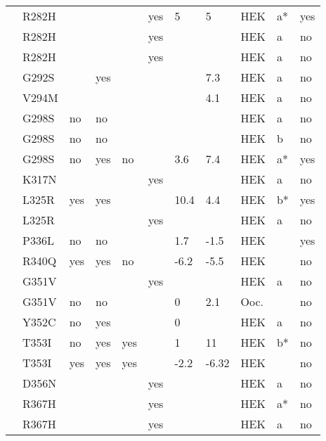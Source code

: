 \begin{tiny}
\begin{longtable}{p{4cm}|l|llll|ll|lll}
\citet{Itoh2005aMutationDB} & R282H &  &  &  & yes & 5 & 5 & HEK & a* & yes \\
\citet{Poelzing2006MutationDB} & R282H &  &  &  & yes &  &  & HEK & a & no \\
\citet{Shinlapawittayatorn2011aMutationDB} & R282H &  &  &  & yes &  &  & HEK & a & no \\
\citet{Shinlapawittayatorn2011aMutationDB} & G292S &  & yes &  &  &  & 7.3 & HEK & a & no \\
\citet{Shinlapawittayatorn2011aMutationDB} & V294M &  &  &  &  &  & 4.1 & HEK & a & no \\
\citet{Saito2009MutationDB} & G298S & no & no &  &  &  &  & HEK & a & no \\
\citet{Saito2009MutationDB} & G298S & no & no &  &  &  &  & HEK & b & no \\
\citet{Wang2002MutationDB} & G298S & no & yes & no &  & 3.6 & 7.4 & HEK & a* & yes \\
\citet{Shinlapawittayatorn2011aMutationDB} & K317N &  &  &  & yes &  &  & HEK & a & no \\
\citet{Keller2005MutationDB} & L325R & yes & yes &  &  & 10.4 & 4.4 & HEK & b* & yes \\
\citet{Shinlapawittayatorn2011aMutationDB} & L325R &  &  &  & yes &  &  & HEK & a & no \\
\citet{Cordeiro2006MutationDB} & P336L & no & no &  &  & 1.7 & -1.5 & HEK &  & yes \\
\citet{Olesen2012MutationDB} & R340Q & yes & yes & no &  & -6.2 & -5.5 & HEK &  & no \\
\citet{Shinlapawittayatorn2011aMutationDB} & G351V &  &  &  & yes &  &  & HEK & a & no \\
\citet{Vatta2002aMutationDB} & G351V & no & no &  &  & 0 & 2.1 & Ooc. &  & no \\
\citet{Guo2016MutationDB} & Y352C & no & yes &  &  & 0 &  & HEK & a & no \\
\citet{Pfahnl2007MutationDB} & T353I & no & yes & yes &  & 1 & 11 & HEK & b* & no \\
\citet{Zhang2015MutationDB} & T353I & yes & yes & yes &  & -2.2 & -6.32 & HEK &  & no \\
\citet{Shinlapawittayatorn2011aMutationDB} & D356N &  &  &  & yes &  &  & HEK & a & no \\
\citet{Hong2004MutationDB} & R367H &  &  &  & yes &  &  & HEK & a* & no \\
\citet{Shinlapawittayatorn2011aMutationDB} & R367H &  &  &  & yes &  &  & HEK & a & no \\

\end{longtable}
\end{tiny}
